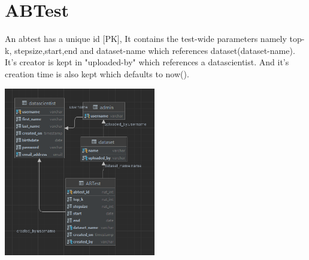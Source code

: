 \documentclass[a4paper,12pt]{article}
\begin{document}
	\section{ABTest}		
	An abtest has a unique id [PK], It contains the test-wide parameters namely top-k, stepsize,start,end and dataset-name which references dataset(dataset-name). It's creator is kept in "uploaded-by" which references a datascientist. And it's creation time is also kept which defaults to now().
			\begin{center}
		  		\includegraphics[width={250px}]{ABTest.png}
	\end{center}
	
\end{document}
